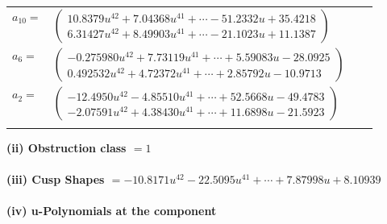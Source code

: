 \documentclass[1p]{elsarticle_modified}
\theoremstyle{definition}
\begin{document}
\begin{tabular}{m{7pt} m{180pt} m{7pt} m{180pt} }
\flushright $a_{10}=$&$\begin{pmatrix}10.8379 u^{42}+7.04368 u^{41}+\cdots-51.2332 u+35.4218\\6.31427 u^{42}+8.49903 u^{41}+\cdots-21.1023 u+11.1387\end{pmatrix}$ \\
\flushright $a_{6}=$&$\begin{pmatrix}-0.275980 u^{42}+7.73119 u^{41}+\cdots+5.59083 u-28.0925\\0.492532 u^{42}+4.72372 u^{41}+\cdots+2.85792 u-10.9713\end{pmatrix}$ \\
\flushright $a_{2}=$&$\begin{pmatrix}-12.4950 u^{42}-4.85510 u^{41}+\cdots+52.5668 u-49.4783\\-2.07591 u^{42}+4.38430 u^{41}+\cdots+11.6898 u-21.5923\end{pmatrix}$\\&\end{tabular}
\flushleft \textbf{(ii) Obstruction class $= 1$}\\~\\
\flushleft \textbf{(iii) Cusp Shapes $= -10.8171 u^{42}-22.5095 u^{41}+\cdots+7.87998 u+8.10939$}\\~\\
\newpage\renewcommand{\arraystretch}{1}
\flushleft \textbf{(iv) u-Polynomials at the component}\newline \\
\end{document}
